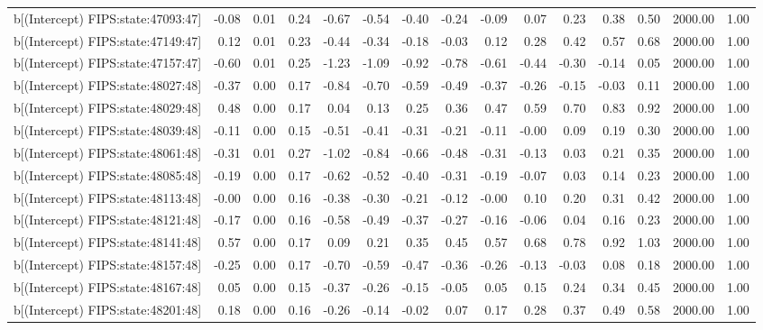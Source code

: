 \begin{table}[ht]
\begin{tabular}{rrrrrrrrrrrrrrr}
  b[(Intercept) FIPS:state:47093:47] & -0.08 & 0.01 & 0.24 & -0.67 & -0.54 & -0.40 & -0.24 & -0.09 & 0.07 & 0.23 & 0.38 & 0.50 & 2000.00 & 1.00 \\ 
  b[(Intercept) FIPS:state:47149:47] & 0.12 & 0.01 & 0.23 & -0.44 & -0.34 & -0.18 & -0.03 & 0.12 & 0.28 & 0.42 & 0.57 & 0.68 & 2000.00 & 1.00 \\ 
  b[(Intercept) FIPS:state:47157:47] & -0.60 & 0.01 & 0.25 & -1.23 & -1.09 & -0.92 & -0.78 & -0.61 & -0.44 & -0.30 & -0.14 & 0.05 & 2000.00 & 1.00 \\ 
  b[(Intercept) FIPS:state:48027:48] & -0.37 & 0.00 & 0.17 & -0.84 & -0.70 & -0.59 & -0.49 & -0.37 & -0.26 & -0.15 & -0.03 & 0.11 & 2000.00 & 1.00 \\ 
  b[(Intercept) FIPS:state:48029:48] & 0.48 & 0.00 & 0.17 & 0.04 & 0.13 & 0.25 & 0.36 & 0.47 & 0.59 & 0.70 & 0.83 & 0.92 & 2000.00 & 1.00 \\ 
  b[(Intercept) FIPS:state:48039:48] & -0.11 & 0.00 & 0.15 & -0.51 & -0.41 & -0.31 & -0.21 & -0.11 & -0.00 & 0.09 & 0.19 & 0.30 & 2000.00 & 1.00 \\ 
  b[(Intercept) FIPS:state:48061:48] & -0.31 & 0.01 & 0.27 & -1.02 & -0.84 & -0.66 & -0.48 & -0.31 & -0.13 & 0.03 & 0.21 & 0.35 & 2000.00 & 1.00 \\ 
  b[(Intercept) FIPS:state:48085:48] & -0.19 & 0.00 & 0.17 & -0.62 & -0.52 & -0.40 & -0.31 & -0.19 & -0.07 & 0.03 & 0.14 & 0.23 & 2000.00 & 1.00 \\ 
  b[(Intercept) FIPS:state:48113:48] & -0.00 & 0.00 & 0.16 & -0.38 & -0.30 & -0.21 & -0.12 & -0.00 & 0.10 & 0.20 & 0.31 & 0.42 & 2000.00 & 1.00 \\ 
  b[(Intercept) FIPS:state:48121:48] & -0.17 & 0.00 & 0.16 & -0.58 & -0.49 & -0.37 & -0.27 & -0.16 & -0.06 & 0.04 & 0.16 & 0.23 & 2000.00 & 1.00 \\ 
  b[(Intercept) FIPS:state:48141:48] & 0.57 & 0.00 & 0.17 & 0.09 & 0.21 & 0.35 & 0.45 & 0.57 & 0.68 & 0.78 & 0.92 & 1.03 & 2000.00 & 1.00 \\ 
  b[(Intercept) FIPS:state:48157:48] & -0.25 & 0.00 & 0.17 & -0.70 & -0.59 & -0.47 & -0.36 & -0.26 & -0.13 & -0.03 & 0.08 & 0.18 & 2000.00 & 1.00 \\ 
  b[(Intercept) FIPS:state:48167:48] & 0.05 & 0.00 & 0.15 & -0.37 & -0.26 & -0.15 & -0.05 & 0.05 & 0.15 & 0.24 & 0.34 & 0.45 & 2000.00 & 1.00 \\ 
  b[(Intercept) FIPS:state:48201:48] & 0.18 & 0.00 & 0.16 & -0.26 & -0.14 & -0.02 & 0.07 & 0.17 & 0.28 & 0.37 & 0.49 & 0.58 & 2000.00 & 1.00 \\ 

\end{tabular}
\end{table}
